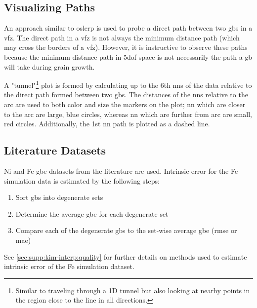 \documentclass[final,twocolumn,12pt]{elsarticle}
\begin{document}
	\subsection{Visualizing  Paths} \label{sec:methods:path}
	An approach similar to \gls{oslerp} is used to probe a direct path between two \glspl{gb} in a \gls{vfz}. The direct path in a \gls{vfz} is not always the minimum distance path (which may cross the borders of a \gls{vfz}). However, it is instructive to observe these paths because the minimum distance path in \gls{5dof} space is not necessarily the path a \gls{gb} will take during grain growth.
	
	A "tunnel"\footnote{Similar to traveling through a 1D tunnel but also looking at nearby points in the region close to the line in all directions. } plot is formed by calculating up to the 6th \glspl{nn} of the \inpt{} data relative to the direct path formed between two \glspl{gb}. The distances of the \glspl{nn} relative to the arc are used to both color and size the markers on the plot; \gls{nn} which are closer to the arc are large, blue circles, whereas \gls{nn} which are further from arc are small, red circles. Additionally, the 1st \gls{nn} path is plotted as a dashed line.
	
	\subsection{Literature Datasets}
	\label{sec:methods:litdata}
	Ni \cite{olmstedSurveyComputedGrain2009} and Fe \cite{kimPhasefieldModeling3D2014} \gls{gbe} datasets from the literature are used. Intrinsic error for the Fe simulation data is estimated by the following steps:
	\begin{enumerate}
	    \item Sort \glspl{gb} into degenerate sets
	    \item Determine the average \gls{gbe} for each degenerate set
	    \item Compare each of the degenerate \glspl{gb} to the set-wise average \gls{gbe} (\gls{rmse} or \gls{mae})
	\end{enumerate}
	See \cref{sec:supp:kim-interp:quality} for further details on methods used to estimate intrinsic error of the Fe simulation dataset.
	
\end{document}
